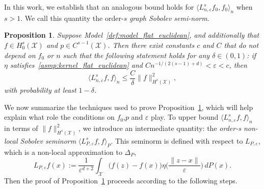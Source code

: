 \documentclass{article}
\newcommand{\1}{\mathbf{1}}
\newcommand{\mc}[1]{\mathcal{#1}}
\newcommand{\dotp}[2]{\langle #1, #2 \rangle}
\theoremstyle{alden}
\theoremstyle{aldenthm}
\newtheorem{proposition}{Proposition}
\theoremstyle{definition}
\theoremstyle{remark}
\begin{document}
In this work, we establish that an analogous bound holds for $\dotp{L_{n,\varepsilon}^sf_0}{f_0}_n$ when $s > 1$. We call this quantity the order-$s$ \emph{graph Sobolev semi-norm}.
\begin{proposition}
	\label{prop:graph_seminorm_ho} 
	Suppose Model~\ref{def:model_flat_euclidean}, and additionally that $f \in H_0^s(\mc{X})$ and $p \in C^{s - 1}(\mc{X})$. Then there exist constants $c$ and $C$ that do not depend on $f_0$ or $n$ such that the following statement holds for any $\delta \in (0,1)$: if $\eta$ satisfies~\ref{asmp:kernel_flat_euclidean} and $Cn^{-1/(2(s - 1) + d)} < \varepsilon < c$, then
	\begin{equation}
	\label{eqn:graph_seminorm_ho}
	\dotp{L_{n,\varepsilon}^s f}{f}_n \leq \frac{C}{\delta} \|f\|_{H^s(\mc{X})}^2 ,
	\end{equation}
	with probability at least $1 - \delta$.
\end{proposition}
We now summarize the techniques used to prove Proposition~\ref{prop:graph_seminorm_ho}, which will help explain what role the conditions on $f_0$,$p$ and $\varepsilon$ play. To upper bound $\dotp{L_{n,\varepsilon}^sf}{f}_n$ in terms of $\|f\|_{H^s(\mc{X})}^2$, we introduce an intermediate quantity: the \emph{order-s non-local Sobolev seminorm} $\dotp{L_{P,\varepsilon}^sf}{f}_{P}$. This seminorm is defined with respect to $L_{P,\varepsilon}$, which is a non-local approximation to $\Delta_P$, 
\begin{equation}
\label{eqn:nonlocal_laplacian}
L_{P,\varepsilon}f(x) := \frac{1}{\varepsilon^{d + 2}}\int_{\mc{X}}\bigl(f(z) - f(x)\bigr) \eta\biggl(\frac{\|z - x\|}{\varepsilon}\biggr) \,dP(x).
\end{equation}
Then the proof of Proposition~\ref{prop:graph_seminorm_ho} proceeds according to the following steps.
\end{document}
